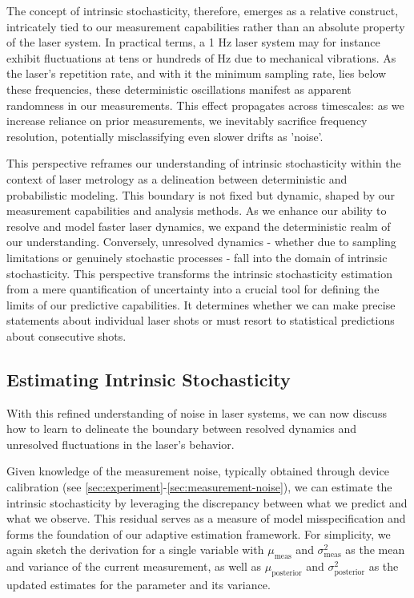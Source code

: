 \documentclass[9pt, twocolumn,superscriptaddress]{revtex4}
\begin{document}
The concept of intrinsic stochasticity, therefore, emerges as a relative construct, intricately tied to our measurement capabilities rather than an absolute property of the laser system. In practical terms, a 1 Hz laser system may for instance exhibit fluctuations at tens or hundreds of Hz due to mechanical vibrations. As the laser's repetition rate, and with it the minimum sampling rate, lies below these frequencies, these deterministic oscillations manifest as apparent randomness in our measurements. This effect propagates across timescales: as we increase reliance on prior measurements, we inevitably sacrifice frequency resolution, potentially misclassifying even slower drifts as 'noise'.

This perspective reframes our understanding of intrinsic stochasticity within the context of laser metrology as a delineation between deterministic and probabilistic modeling. This boundary is not fixed but dynamic, shaped by our measurement capabilities and analysis methods. As we enhance our ability to resolve and model faster laser dynamics, we expand the deterministic realm of our understanding. Conversely, unresolved dynamics - whether due to sampling limitations or genuinely stochastic processes - fall into the domain of intrinsic stochasticity. This perspective transforms the intrinsic stochasticity estimation from a mere quantification of uncertainty into a crucial tool for defining the limits of our predictive capabilities. It determines whether we can make precise statements about individual laser shots or must resort to statistical predictions about consecutive shots.

\subsection{Estimating Intrinsic Stochasticity}\label{sec:adaptive_process_noise}

With this refined understanding of noise in laser systems, we can now discuss how to learn to delineate the boundary between resolved dynamics and unresolved fluctuations in the laser's behavior. 

Given knowledge of the measurement noise, typically obtained through device calibration (see \cref{sec:experiment}-\ref{sec:measurement-noise}), we can estimate the intrinsic stochasticity by leveraging the discrepancy between what we predict and what we observe. This residual serves as a measure of model misspecification and forms the foundation of our adaptive estimation framework. For simplicity, we again sketch the derivation for a single variable with  \(\mu_{\text{meas}}\) and \(\sigma^2_{\text{meas}}\) as the mean and variance of the current measurement, as well as \(\mu_{\text{posterior}}\) and \(\sigma^2_{\text{posterior}}\) as the updated estimates for the parameter and its variance.
\end{document}
